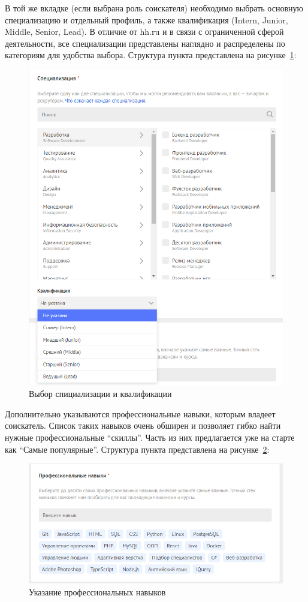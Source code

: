 \documentclass[master, och, pract]{SCWorks}
\begin{document}
\begin{enumerate}
    В той же вкладке (если выбрана роль соискателя) необходимо выбрать основную 
    специализацию и отдельный профиль, а также квалификация (Intern, Junior, Middle, 
    Senior, Lead). В отличие от hh.ru и в связи с ограниченной сферой деятельности, 
    все специализации представлены наглядно и распределены по категориям для удобства выбора.
    Структура пункта представлена на рисунке~\ref{fig:7}:
    \begin{figure}[!ht]
        \centering
        \includegraphics[width=12cm]{images/image6.png}
        \caption{\label{fig:7}%
            Выбор спициализации и квалификации}
    \end{figure}

    Дополнительно указываются профессиональные навыки, которым владеет соискатель. 
    Список таких навыков очень обширен и позволяет гибко найти нужные профессиональные 
    “скиллы”. Часть из них предлагается уже на старте как “Самые популярные”. 
    Структура пункта представлена на рисунке~\ref{fig:8}:
    \begin{figure}[!ht]
        \centering
        \includegraphics[width=12cm]{images/image19.png}
        \caption{\label{fig:8}%
            Указание профессиональных навыков}
    \end{figure}


\end{enumerate}
\end{document}
